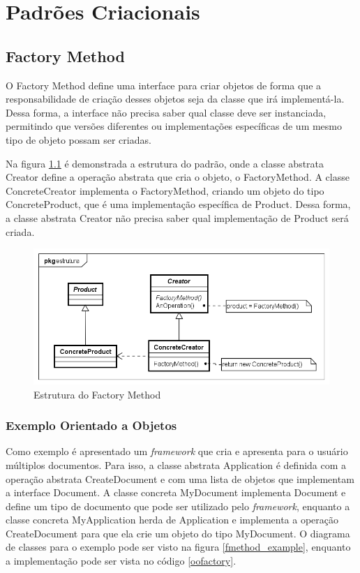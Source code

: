 \chapter{Padrões Criacionais}

\section{Factory Method}

O Factory Method define uma interface para criar 
objetos de forma que a responsabilidade de criação 
desses objetos seja da classe que irá implementá-la. 
Dessa forma, a interface não precisa saber qual 
classe deve ser instanciada, permitindo que versões 
diferentes ou implementações específicas de um mesmo 
tipo de objeto possam ser criadas.

Na figura \ref{fmethod_struct} é demonstrada 
a estrutura do padrão, onde a classe abstrata Creator 
define a operação abstrata que cria o objeto, 
o FactoryMethod. A classe ConcreteCreator 
implementa o FactoryMethod, criando um objeto 
do tipo ConcreteProduct, que é uma implementação 
específica de Product. Dessa forma, a classe 
abstrata Creator não precisa saber qual implementação 
de Product será criada.

\begin{figure}[htb]
	\caption{\label{fmethod_struct}Estrutura do Factory Method}
	\begin{center}
	    \includegraphics[scale=0.5]{5_padroes-contexto-funcional/5.1_criacionais/5.1.1_factory-method/factorymethod_struct.png}
	\end{center}
\end{figure}


\subsection*{Exemplo Orientado a Objetos}

Como exemplo é apresentado um \textit{framework} 
que cria e apresenta para o usuário múltiplos 
documentos. Para isso, a classe abstrata 
Application é definida com a operação abstrata 
CreateDocument e com uma lista de objetos 
que implementam a interface Document. A classe 
concreta MyDocument implementa Document e define 
um tipo de documento que pode ser utilizado pelo 
\textit{framework}, enquanto a classe concreta 
MyApplication herda de Application e implementa 
a operação CreateDocument para que ela crie 
um objeto do tipo MyDocument. O diagrama de classes 
para o exemplo pode ser visto na figura \ref{fmethod_example}, 
enquanto a implementação pode ser vista no 
código \ref{oofactory}.


